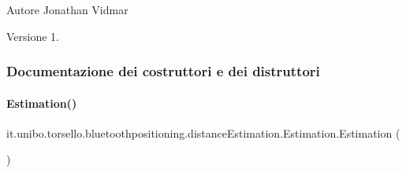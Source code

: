 \begin{DoxyAuthor}{Autore}
Jonathan Vidmar 
\end{DoxyAuthor}
\begin{DoxyVersion}{Versione}
1. 
\end{DoxyVersion}


\subsubsection{Documentazione dei costruttori e dei distruttori}
\hypertarget{classit_1_1unibo_1_1torsello_1_1bluetoothpositioning_1_1distanceEstimation_1_1Estimation_abd84ded1e26d40304606ce0572735106_abd84ded1e26d40304606ce0572735106}{}\label{classit_1_1unibo_1_1torsello_1_1bluetoothpositioning_1_1distanceEstimation_1_1Estimation_abd84ded1e26d40304606ce0572735106_abd84ded1e26d40304606ce0572735106} 
\paragraph{\texorpdfstring{Estimation()}{Estimation()}}
{\footnotesize\ttfamily it.\+unibo.\+torsello.\+bluetoothpositioning.\+distance\+Estimation.\+Estimation.\+Estimation (\begin{DoxyParamCaption}{ }\end{DoxyParamCaption})}


